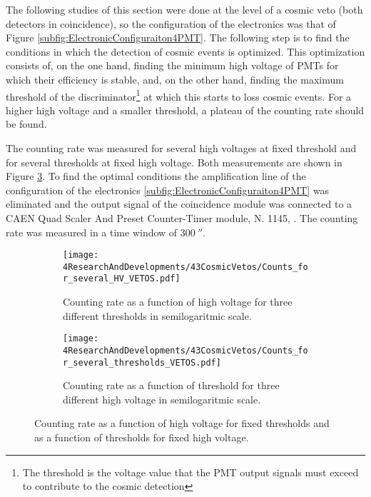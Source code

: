 The following studies of this section were done at the level of a cosmic veto (both detectors in coincidence), so the configuration of the electronics was that of Figure \ref{subfig:ElectronicConfiguraiton4PMT}. The following step is to find the conditions in which the detection of cosmic events is optimized. This optimization consists of, on the one hand, finding the minimum high voltage of PMTs for which their efficiency is stable, and, on the other hand, finding the maximum threshold of the discriminator\footnote{The threshold is the voltage value that the PMT output signals must exceed to contribute to the cosmic detection} at which this starts to loss cosmic events. For a higher high voltage and a smaller threshold, a plateau of the counting rate should be found.

The counting rate was measured for several high voltages at fixed threshold and for several thresholds at fixed high voltage. Both measurements are shown in Figure \ref{fig:HVandThresholdsPLateaus}. To find the optimal conditions the amplification line of the configuration of the electronics \ref{subfig:ElectronicConfiguraiton4PMT} was eliminated and the output signal of the coincidence module was connected to a CAEN Quad Scaler And Preset Counter-Timer module, N. 1145, \cite{ScalerDataSheet}. The counting rate was measured in a time window of $300~\second$.

\begin{figure}
\centering
    \begin{subfigure}[b]{0.8\textwidth}
    \centering
    \texttt{[image: 4ResearchAndDevelopments/43CosmicVetos/Counts\_for\_several\_HV\_VETOS.pdf]}  
    \caption{Counting rate as a function of high voltage for three different thresholds in semilogaritmic scale.\label{subfig:HVPLateauVetos}}
    \end{subfigure}
    \hfill
    \begin{subfigure}[b]{0.8\textwidth}
    \centering
    \texttt{[image: 4ResearchAndDevelopments/43CosmicVetos/Counts\_for\_several\_thresholds\_VETOS.pdf]}  
    \caption{Counting rate as a function of threshold for three different high voltage in semilogaritmic scale.\label{subfig:ThresholdsPlateau}}
    \end{subfigure}
 \caption{Counting rate as a function of high voltage for fixed thresholds and as a function of thresholds for fixed high voltage.}
 \label{fig:HVandThresholdsPLateaus}
\end{figure}

